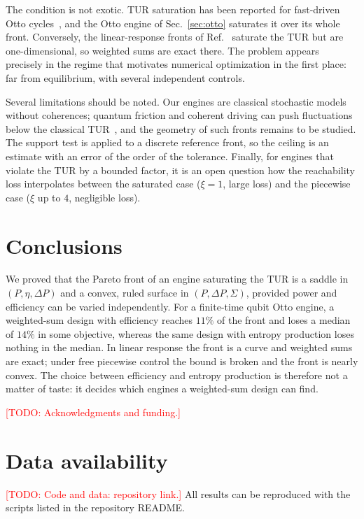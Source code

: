 \documentclass[pre,twocolumn,superscriptaddress,nofootinbib,longbibliography]{revtex4-2}
\newcommand{\todo}[1]{\textcolor{red}{[TODO: #1]}}
\begin{document}
The condition is not exotic. TUR saturation has been reported for fast-driven Otto
cycles~\cite{Erdman2023}, and the Otto engine of Sec.~\ref{sec:otto} saturates it over its whole
front. Conversely, the linear-response fronts of Ref.~\cite{Almanza2026} saturate the TUR but are
one-dimensional, so weighted sums are exact there. The problem appears precisely in the regime
that motivates numerical optimization in the first place: far from equilibrium, with several
independent controls.

Several limitations should be noted. Our engines are classical stochastic models without
coherences; quantum friction and coherent driving can push fluctuations below the classical
TUR~\cite{Miller2021,Gramajo2023}, and the geometry of such fronts remains to be studied. The
support test is applied to a discrete reference front, so the ceiling is an estimate with an
error of the order of the tolerance. Finally, for engines that violate the TUR by a bounded
factor, it is an open question how the reachability loss interpolates between the saturated case
($\xi = 1$, large loss) and the piecewise case ($\xi$ up to $4$, negligible loss).

\section{Conclusions}

We proved that the Pareto front of an engine saturating the TUR is a saddle in
$(P,\eta,\Delta P)$ and a convex, ruled surface in $(P,\Delta P,\Sigma)$, provided power and
efficiency can be varied independently. For a finite-time qubit Otto engine, a weighted-sum design
with efficiency reaches $11\%$ of the front and loses a median of $14\%$ in some objective, whereas
the same design with entropy production loses nothing in the median. In linear response the front
is a curve and weighted sums are exact; under free piecewise control the bound is broken and the
front is nearly convex. The choice between efficiency and entropy production is therefore not a
matter of taste: it decides which engines a weighted-sum design can find.

\begin{acknowledgments}
\todo{Acknowledgments and funding.}
\end{acknowledgments}

\section*{Data availability}
\todo{Code and data: repository link.} All results can be reproduced with the scripts listed in
the repository README.
\end{document}
